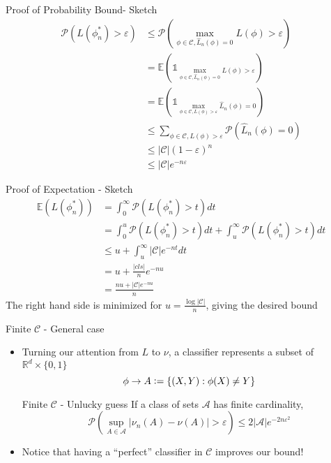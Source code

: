\documentclass{beamer}
\renewcommand{\Pr}[1]{\mathcal{P} \left( #1 \right)}
\newcommand{\cls}{\mathcal{C}}
\newcommand{\E}[1]{\mathbb{E}\left( #1 \right)}
\newcommand{\R}{\mathbb{R}}
\newcommand{\defeq}{\vcentcolon=}
\newcommand{\pa}[1]{\left( #1 \right)}
\newcommand{\abs}[1]{\left| #1 \right|}
\newcommand{\br}[1]{\left\{ #1 \right\} }
\newcommand{\eps}{\varepsilon}
\begin{document}
\begin{frame}{Proof of Probability Bound- Sketch}
\begin{align*}
\Pr{ L(\phi^*_n) > \eps } & \leq \Pr{ \max_{\phi \in \cls, \hat{L}_n(\phi) = 0} L(\phi) > \eps} \\
	& = \E{ \mathds{1}_{\max_{\phi \in \cls, \hat{L}_n(\phi) = 0} L(\phi) > \eps}} \\
	& = \E {\mathds{1}_{\max_{ \phi \in \cls, L(\phi) > \eps} \hat{L}_n(\phi) = 0}} \\
	& \leq  \sum_{\phi \in \cls, L(\phi) > \eps} \Pr{ \hat{L}_n (\phi) = 0}  \\
	& \leq \abs{\cls} \pa{1-\eps}^n \\
	& \leq \abs{\cls} e^{-n\eps} \end{align*}
\end{frame}

\begin{frame}{Proof of Expectation - Sketch}
\begin{align*}
\E{L(\phi^*_n)} &= \int_0^\infty \Pr{L(\phi^*_n) > t} dt \\
	&= \int_0^u \Pr{L(\phi^*_n) > t} dt + \int_u^\infty \Pr{L(\phi^*_n) > t} dt \\
	& \leq u + \int_u^\infty \abs{\cls}e^{-nt} dt \\
	& = u + \frac{\abs{cls}}n e^{-nu}\\
	& = \frac{ nu+ \abs{\cls}e^{-nu}}n
\end{align*}
The right hand side is minimized for $u = \frac{\log\abs{\cls}}n$, giving the desired bound
\end{frame}


\begin{frame}{Finite $\cls$ - General case}
\begin{itemize}
\item Turning our attention from $L$ to $\nu$, a classifier represents a subset of $\R^d \times \{0,1\}$ 
\[ \phi \to A \defeq \br{ (X,Y) : \phi(X) \ne Y}\]
\begin{block}{Finite $\cls$ - Unlucky guess}
If a class of sets $\mathcal{A}$ has finite cardinality, 
\[ \Pr{ \sup_{A\in \mathcal{A}} \abs{\nu_n(A) - \nu(A)} > \eps} \leq 2\abs{\mathcal{A}} e^{-2n\eps^2} \]
\end{block}
\item Notice that having a ``perfect'' classifier in $\cls$ improves our bound!
\end{itemize}
\end{frame}
\end{document}
